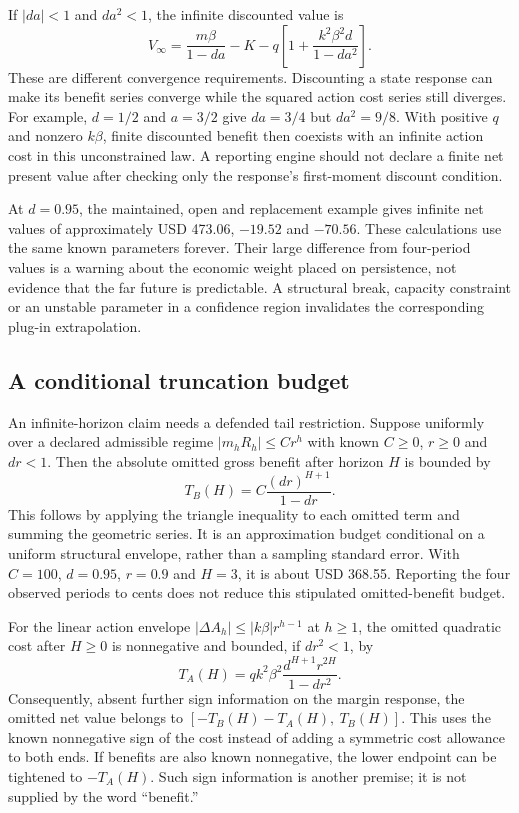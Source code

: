 If $|da|<1$ and $da^2<1$, the infinite discounted value is
\begin{equation}
 V_\infty=\frac{m\beta}{1-da}-K
       -q\left[1+\frac{k^2\beta^2d}{1-da^2}\right].
 \label{exec17:s6-infinite-value}
\end{equation}
These are different convergence requirements. Discounting a state response
can make its benefit series converge while the squared action cost series
still diverges. For example, $d=1/2$ and $a=3/2$ give $da=3/4$ but
$da^2=9/8$. With positive $q$ and nonzero $k\beta$, finite discounted
benefit then coexists with an infinite action cost in this unconstrained
law. A reporting engine should not declare a finite net present value
after checking only the response's first-moment discount condition.

At $d=0.95$, the maintained, open and replacement example gives infinite
net values of approximately USD 473.06, $-19.52$ and $-70.56$.
These calculations use the same known parameters forever. Their large
difference from four-period values is a warning about the economic weight
placed on persistence, not evidence that the far future is predictable.
A structural break, capacity constraint or an unstable parameter in a
confidence region invalidates the corresponding plug-in extrapolation.

\subsection{A conditional truncation budget}

An infinite-horizon claim needs a defended tail restriction. Suppose
uniformly over a declared admissible regime
$|m_hR_h|\leq C r^h$ with known $C\geq0$, $r\geq0$ and $dr<1$.
Then the absolute omitted gross benefit after horizon $H$ is bounded by
\begin{equation}
 T_B(H)=C\frac{(dr)^{H+1}}{1-dr}.
 \label{exec17:s6-tail-budget}
\end{equation}
This follows by applying the triangle inequality to each omitted term
and summing the geometric series. It is an approximation budget
conditional on a uniform structural envelope, rather than a sampling
standard error. With $C=100$, $d=0.95$, $r=0.9$ and $H=3$, it is
about USD 368.55. Reporting the four observed periods to cents does
not reduce this stipulated omitted-benefit budget.

For the linear action envelope
$|\Delta A_h|\leq |k\beta|r^{h-1}$ at $h\geq1$, the omitted
quadratic cost after $H\geq0$ is nonnegative and bounded, if $dr^2<1$,
by
\begin{equation}
 T_A(H)=qk^2\beta^2\frac{d^{H+1}r^{2H}}{1-dr^2}.
 \label{exec17:s6-action-tail}
\end{equation}
Consequently, absent further sign information on the margin response,
the omitted net value belongs to
$[-T_B(H)-T_A(H),\ T_B(H)]$. This uses the known nonnegative
sign of the cost instead of adding a symmetric cost allowance to both
ends. If benefits are also known nonnegative, the lower endpoint can
be tightened to $-T_A(H)$. Such sign information is another premise;
it is not supplied by the word ``benefit.''


